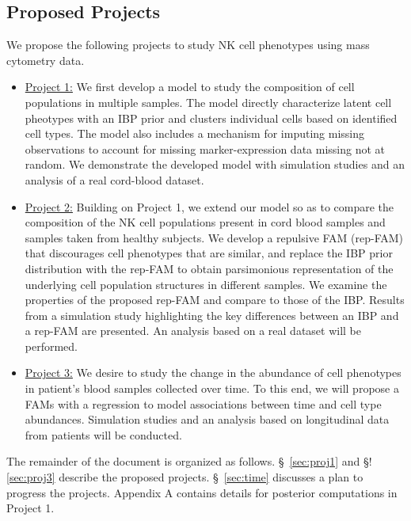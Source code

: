 \documentclass[12pt,]{article}
\begin{document}

\subsection{Proposed Projects}
We propose the following projects to study NK cell phenotypes using mass cytometry data. 
\begin{itemize}
\item \underline{Project 1:}
We first develop a model to study the composition of cell populations in multiple samples.
The model directly characterize latent cell pheotypes with an IBP prior and 
clusters individual cells based on identified cell types. 
The model also includes a mechanism for imputing missing observations to account 
for missing marker-expression data missing not at
random. We demonstrate the developed model with simulation studies and an 
analysis of a real cord-blood dataset.

\item \underline{Project 2:}
Building on Project 1, we extend our model so as to compare the composition of 
the NK cell
populations present in cord blood samples and samples taken from healthy subjects.
We develop a repulsive FAM (rep-FAM) that discourages cell phenotypes that are similar, and replace the IBP prior distribution with the rep-FAM to obtain parsimonious representation of the underlying cell population structures in different samples.  We examine the properties of the proposed rep-FAM and compare to those of the IBP.  Results from a simulation study
highlighting the key differences between an IBP and a rep-FAM are presented.  An analysis based on a real dataset will be performed.

\item \underline{Project 3:}
We desire to study the change in the abundance of cell phenotypes in patient's
blood samples collected over time. To this end, we will propose a
FAMs with a regression to model associations between time and cell type abundances.  Simulation studies and an analysis based on longitudinal data from patients will be
conducted.

\end{itemize} 
The remainder of the document is organized as follows.
\S~\ref{sec:proj1} and \S!\ref{sec:proj3} describe the proposed projects.
\S~\ref{sec:time} discusses a plan to progress the projects.  
Appendix A contains details for posterior computations in Project 1.
\end{document}

